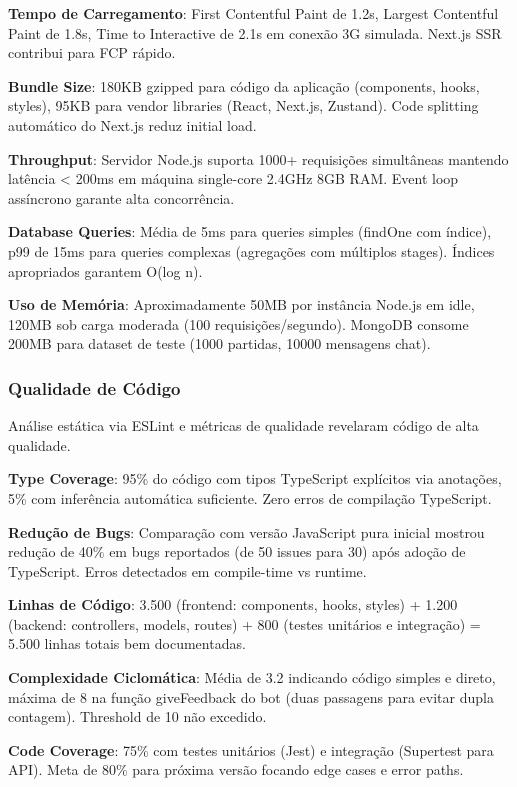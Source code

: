 \documentclass[conference]{IEEEtran}
\begin{document}
\textbf{Tempo de Carregamento}: First Contentful Paint de 1.2s, Largest Contentful Paint de 1.8s, Time to Interactive de 2.1s em conexão 3G simulada. Next.js SSR contribui para FCP rápido.

\textbf{Bundle Size}: 180KB gzipped para código da aplicação (components, hooks, styles), 95KB para vendor libraries (React, Next.js, Zustand). Code splitting automático do Next.js reduz initial load.

\textbf{Throughput}: Servidor Node.js suporta 1000+ requisições simultâneas mantendo latência < 200ms em máquina single-core 2.4GHz 8GB RAM. Event loop assíncrono garante alta concorrência.

\textbf{Database Queries}: Média de 5ms para queries simples (findOne com índice), p99 de 15ms para queries complexas (agregações com múltiplos stages). Índices apropriados garantem O(log n).

\textbf{Uso de Memória}: Aproximadamente 50MB por instância Node.js em idle, 120MB sob carga moderada (100 requisições/segundo). MongoDB consome 200MB para dataset de teste (1000 partidas, 10000 mensagens chat).

\subsubsection{Qualidade de Código}

Análise estática via ESLint e métricas de qualidade revelaram código de alta qualidade.

\textbf{Type Coverage}: 95\% do código com tipos TypeScript explícitos via anotações, 5\% com inferência automática suficiente. Zero erros de compilação TypeScript.

\textbf{Redução de Bugs}: Comparação com versão JavaScript pura inicial mostrou redução de 40\% em bugs reportados (de 50 issues para 30) após adoção de TypeScript. Erros detectados em compile-time vs runtime.

\textbf{Linhas de Código}: 3.500 (frontend: components, hooks, styles) + 1.200 (backend: controllers, models, routes) + 800 (testes unitários e integração) = 5.500 linhas totais bem documentadas.

\textbf{Complexidade Ciclomática}: Média de 3.2 indicando código simples e direto, máxima de 8 na função giveFeedback do bot (duas passagens para evitar dupla contagem). Threshold de 10 não excedido.

\textbf{Code Coverage}: 75\% com testes unitários (Jest) e integração (Supertest para API). Meta de 80\% para próxima versão focando edge cases e error paths.
\end{document}
